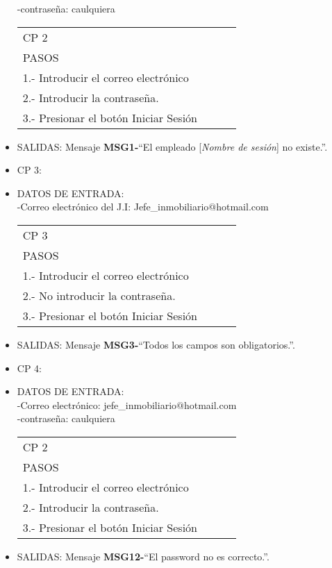 \begin{itemize}
	-contraseña: caulquiera
\begin{center}			
	\begin{tabular}{|l|l|l|l|}
		\hline
		CP 2\\
		PASOS\\
		\hline 1.- Introducir el correo electrónico\\
		\hline 2.- Introducir la contraseña.\\
		\hline 3.- Presionar el botón Iniciar Sesión\\
		\hline
	\end{tabular}
\end{center}
\item SALIDAS: Mensaje {\bf MSG1-}``El empleado [{\em Nombre de sesión}] no existe.''.
  
\item CP 3:
\item DATOS DE ENTRADA:\\
	-Correo electrónico del J.I: Jefe\_inmobiliario$@$hotmail.com
\begin{center}			
	\begin{tabular}{|l|l|l|l|}
		\hline
		CP 3\\
		PASOS\\
		\hline 1.- Introducir el correo electrónico\\
		\hline 2.- No introducir la contraseña.\\
		\hline 3.- Presionar el botón Iniciar Sesión\\
		\hline
	\end{tabular}
\end{center}
\item SALIDAS:  Mensaje {\bf MSG3-}``Todos los campos son obligatorios.''.
\item CP 4:
\item DATOS DE ENTRADA:\\
-Correo electrónico: jefe\_inmobiliario$@$hotmail.com\\
-contraseña: caulquiera
\begin{center}			
	\begin{tabular}{|l|l|l|l|}
		\hline
		CP 2\\
		PASOS\\
		\hline 1.- Introducir el correo electrónico\\
		\hline 2.- Introducir la contraseña.\\
		\hline 3.- Presionar el botón Iniciar Sesión\\
		\hline
	\end{tabular}
\end{center}
\item SALIDAS: Mensaje {\bf MSG12-}``El password no es correcto.''.
\end{itemize}

